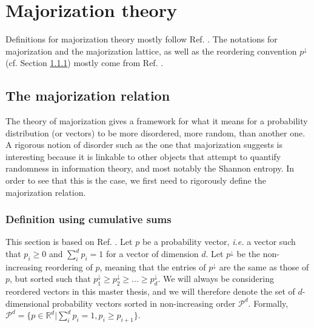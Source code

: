 \chapter{Majorization theory} \label{chap:majorization}

Definitions for majorization theory mostly follow Ref. \cite{marshall_inequalities_2011}. The notations for majorization and the majorization lattice, as well as the reordering convention $p^\downarrow$ (cf. Section \ref{sec:cumulative}) mostly come from Ref. \cite{cicalese_supermodularity_2002}.



\section{The majorization relation} \label{sec:majorization}

The theory of majorization gives a framework for what it means for a probability distribution (or vectors) to be more disordered, more random, than another one. A rigorous notion of disorder such as the one that majorization suggests is interesting because it is linkable to other objects that attempt to quantify randomness in information theory, and most notably the Shannon entropy. In order to see that this is the case, we first need to rigorously define the majorization relation.



\subsection{Definition using cumulative sums} \label{sec:cumulative}

This section is based on Ref. \cite[pp. 4--10]{marshall_inequalities_2011}. Let $p$ be a probability vector, \textit{i.e.} a vector such that $p_i \geq 0$ and $\sum_{i}^{d} p_i = 1$ for a vector of dimension $d$. Let $p^\downarrow$ be the non-increasing reordering of $p$, meaning that the entries of $p^\downarrow$ are the same as those of $p$, but sorted such that $p^\downarrow_1 \geq p^\downarrow_2 \geq ... \geq p^\downarrow_d$. We will always be considering reordered vectors in this master thesis, and we will therefore denote the set of $d$-dimensional probability vectors sorted in non-increasing order $\mathcal{P}^d$. Formally, $\mathcal{P}^d = \{p \in \mathbb{R}^d | \sum_{i}^{d} p_i = 1, p_i \geq p_{i+1}\}$.

